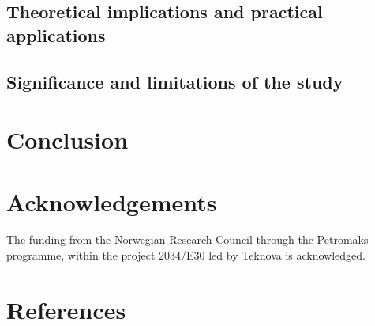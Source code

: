 \documentclass[final,times,5p]{elsarticle}
\begin{document}
	\subsection{Theoretical implications and practical applications}


	
	\subsection{Significance and limitations of the study}


\section{Conclusion}
\label{sec:conclusion}
			

\section*{Acknowledgements}
The funding from the Norwegian Research Council through the Petromaks programme, within the project 2034/E30 led by Teknova is acknowledged. 


\appendix



\section*{References}
\label{References}



			
\end{document}
